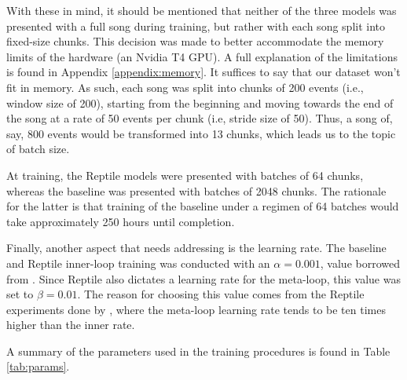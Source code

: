 \documentclass[a4paper]{book}
\begin{document}
With these in mind, it should be mentioned that neither of the three models was presented with a full song during training, but rather with each song split into fixed-size chunks. This decision was made to better accommodate the memory limits of the hardware (an Nvidia T4 GPU). A full explanation of the limitations is found in Appendix \ref{appendix:memory}. It suffices to say that our dataset won't fit in memory. As such, each song was split into chunks of 200 events (i.e., window size of 200), starting from the beginning and moving towards the end of the song at a rate of 50 events per chunk (i.e, stride size of 50). Thus, a song of, say, 800 events would be transformed into 13 chunks, which leads us to the topic of batch size.

At training, the Reptile models were presented with batches of 64 chunks, whereas the baseline was presented with batches of 2048 chunks. The rationale for the latter is that training of the baseline under a regimen of 64 batches would take approximately 250 hours until completion.

Finally, another aspect that needs addressing is the learning rate. The baseline and Reptile inner-loop training was conducted with an $\alpha = 0.001$, value borrowed from \textcite{oore_this_2018}. Since Reptile also dictates a learning rate for the meta-loop, this value was set to $\beta = 0.01$. The reason for choosing this value comes from the Reptile experiments done by \textcite{nichol_first-order_2018}, where the meta-loop learning rate tends to be ten times higher than the inner rate. 

A summary of the parameters used in the training procedures is found in Table \ref{tab:params}.
\end{document}
